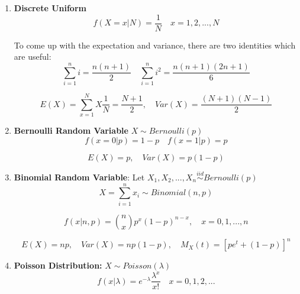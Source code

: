\documentclass{article}
\begin{document}
\begin{enumerate}
    \item \textbf{Discrete Uniform}
    \begin{equation*}
        f(X=x|N) = \frac{1}{N} \quad x = 1,2,...,N
    \end{equation*}

    To come up with the expectation and variance, there are two identities which are useful:
    \begin{equation*}
        \sum\limits_{i=1}^n i = \frac{n(n+1)}{2} \quad \sum\limits_{i=1}^n i^2 = \frac{n(n+1)(2n+1)}{6}
    \end{equation*}
    
    \begin{equation*}
        E(X) = \sum\limits_{x=1}^N X \frac{1}{N} = \frac{N+1}{2}, \quad Var(X) = \frac{(N+1)(N-1)}{2}
    \end{equation*}
    
    \item \textbf{Bernoulli Random Variable} $X \sim Bernoulli(p)$
    \begin{equation*}
        f(x=0|p) = 1-p \quad f(x=1|p) = p
    \end{equation*}
    
    \begin{equation*}
        E(X) = p, \quad Var(X) = p(1-p)
    \end{equation*}
    
    \item \textbf{Binomial Random Variable}: Let $X_1, X_2,...,X_n \overset{iid}{\sim} Bernoulli(p) $
    \begin{equation*}
        X = \sum\limits_{i=1}^n x_i \sim Binomial(n,p)
    \end{equation*}
    
    \begin{equation*}
        f(x|n,p) = {n \choose x} p^x(1-p)^{n-x}, \quad x = 0,1,...,n
    \end{equation*}
    
    \begin{equation*}
        E(X) = np, \quad Var(X) = np(1-p), \quad M_X(t) = [pe^t + (1-p)]^n
    \end{equation*}
    
    \item \textbf{Poisson Distribution:} $X \sim Poisson(\lambda)$
    \begin{equation*}
        f(x|\lambda) = e^{-\lambda} \frac{\lambda^x}{x!} \quad x = 0,1,2,...
    \end{equation*}
    

\end{enumerate}
\end{document}
